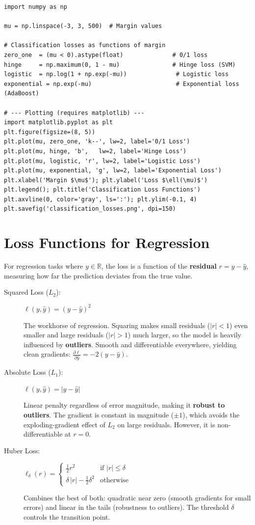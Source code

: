 \begin{lstlisting}[style=pythonstyle]
import numpy as np

mu = np.linspace(-3, 3, 500)  # Margin values

# Classification losses as functions of margin
zero_one  = (mu < 0).astype(float)              # 0/1 loss
hinge     = np.maximum(0, 1 - mu)               # Hinge loss (SVM)
logistic  = np.log(1 + np.exp(-mu))              # Logistic loss
exponential = np.exp(-mu)                        # Exponential loss (AdaBoost)

# --- Plotting (requires matplotlib) ---
import matplotlib.pyplot as plt
plt.figure(figsize=(8, 5))
plt.plot(mu, zero_one, 'k--', lw=2, label='0/1 Loss')
plt.plot(mu, hinge, 'b',   lw=2, label='Hinge Loss')
plt.plot(mu, logistic, 'r', lw=2, label='Logistic Loss')
plt.plot(mu, exponential, 'g', lw=2, label='Exponential Loss')
plt.xlabel('Margin $\mu$'); plt.ylabel('Loss $\ell(\mu)$')
plt.legend(); plt.title('Classification Loss Functions')
plt.axvline(0, color='gray', ls=':'); plt.ylim(-0.1, 4)
plt.savefig('classification_losses.png', dpi=150)
\end{lstlisting}

\section*{Loss Functions for Regression}

For regression tasks where $y \in \mathbb{R}$, the loss is a function of the \textbf{residual} $r = y - \hat{y}$, measuring how far the prediction deviates from the true value.

\begin{description}
    \item[Squared Loss ($L_2$):] $\ell(y, \hat{y}) = (y - \hat{y})^2$

    The workhorse of regression. Squaring makes small residuals ($|r| < 1$) even smaller and large residuals ($|r| > 1$) much larger, so the model is heavily influenced by \textbf{outliers}. Smooth and differentiable everywhere, yielding clean gradients: $\frac{\partial \ell}{\partial \hat{y}} = -2(y - \hat{y})$.

    \item[Absolute Loss ($L_1$):] $\ell(y, \hat{y}) = |y - \hat{y}|$

    Linear penalty regardless of error magnitude, making it \textbf{robust to outliers}. The gradient is constant in magnitude ($\pm 1$), which avoids the exploding-gradient effect of $L_2$ on large residuals. However, it is non-differentiable at $r = 0$.

    \item[Huber Loss:] $\ell_\delta(r) = \begin{cases} \frac{1}{2}r^2 & \text{if } |r| \leq \delta \\ \delta\,|r| - \frac{1}{2}\delta^2 & \text{otherwise}\end{cases}$

    Combines the best of both: quadratic near zero (smooth gradients for small errors) and linear in the tails (robustness to outliers). The threshold $\delta$ controls the transition point.
\end{description}

